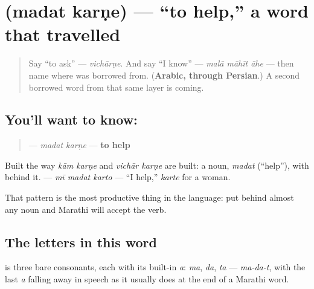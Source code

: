\section[madat karṇe]{  (madat karṇe) — \textquotedblleft{}to help,\textquotedblright{} a word that travelled}

\label{lesson:MR-C09-madat-karne}



\begin{quote}
Say \textquotedblleft{}to ask\textquotedblright{} — \emph{vichārṇe}. And say \textquotedblleft{}I know\textquotedblright{} — \emph{malā māhīt āhe} — then name where \textbf{} was borrowed from. (\textbf{Arabic, through Persian}.) A second borrowed word from that same layer is coming.
\end{quote}

\subsection*{You'll want to know:  }
\begin{quote}
\textbf{ } — \emph{madat karṇe} — \textbf{to help}
\end{quote}

Built the way \emph{kām karṇe} and \emph{vichār karṇe} are built: a noun, \textbf{} \emph{madat} (\textquotedblleft{}help\textquotedblright{}), with \textbf{} behind it. \textbf{  } — \emph{mī madat karto} — \textquotedblleft{}I help,\textquotedblright{} \textbf{} \emph{karte} for a woman.

That pattern is the most productive thing in the language: put \textbf{} behind almost any noun and Marathi will accept the verb.

\subsection*{The letters in this word}
\textbf{} is three bare consonants, each with its built-in \emph{a}: \textbf{} \emph{ma}, \textbf{} \emph{da}, \textbf{} \emph{ta} — \emph{ma-da-t}, with the last \emph{a} falling away in speech as it usually does at the end of a Marathi word.


